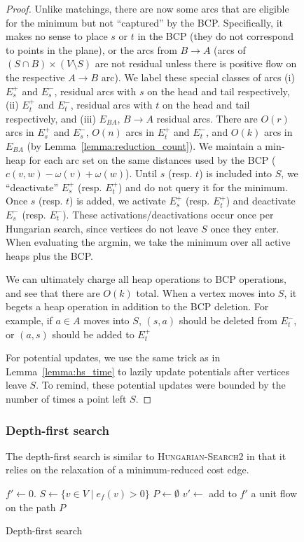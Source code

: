 \documentclass[11pt]{article}
\theoremstyle{plain}
\begin{document}
\begin{figure*}
\begin{proof}
Unlike matchings, there are now some arcs that are eligible for the
minimum but not ``captured'' by the BCP.
Specifically, it makes no sense to place $s$ or $t$ in the BCP
(they do not correspond to points in the plane), or the arcs from
$B \to A$ (arcs of $(S \cap B) \times (V \setminus S)$ are not residual
unless there is positive flow on the respective $A \to B$ arc).
We label these special classes of arcs (i) $E_s^+$ and $E_s^-$,
residual arcs with $s$ on the head and tail respectively, (ii)
$E_t^+$ and $E_t^-$, residual arcs with $t$ on the head and tail
respectively, and (iii) $E_{BA}$, $B \to A$ residual arcs.
There are $O(r)$ arcs in $E_s^+$ and $E_s^-$, $O(n)$ arcs in $E_t^+$
and $E_t^-$, and $O(k)$ arcs in $E_{BA}$
(by Lemma~\ref{lemma:reduction_count}).
We maintain a min-heap for each arc set on the same distances used
by the BCP ($c(v, w) - \omega(v) + \omega(w)$).
Until $s$ (resp. $t$) is included into $S$, we ``deactivate'' $E_s^+$
(resp. $E_t^+$) and do not query it for the minimum.
Once $s$ (resp. $t$) is added, we activate $E_s^+$ (resp. $E_t^+$) and
deactivate $E_s^-$ (resp. $E_t^-$).
These activations/deactivations occur once per Hungarian search, since
vertices do not leave $S$ once they enter.
When evaluating the argmin, we take the minimum over all active heaps
plus the BCP.

We can ultimately charge all heap operations to BCP operations, and
see that there are $O(k)$ total.
When a vertex moves into $S$, it begets a heap operation in addition
to the BCP deletion.
For example, if $a \in A$ moves into $S$, $(s, a)$ should be deleted
from $E_t^-$, or $(a, s)$ should be added to $E_t^+$


For potential updates, we use the same trick as in
Lemma~\ref{lemma:hs_time} to lazily update potentials after vertices
leave $S$.
To remind, these potential updates were bounded by the number of times
a point left $S$.

\end{proof}


\subsubsection{Depth-first search}

The depth-first search is similar to \textsc{Hungarian-Search2} in that it
relies on the relaxation of a minimum-reduced cost edge.
\begin{algorithm}
\caption{Depth-first search}
\begin{algorithmic}[1]
	\State $f' \gets 0$.
	\State $S \gets \{v \in V \mid e_f(v) > 0\}$
	\State $P \gets \emptyset$
	\Repeat
		\State $v' \gets$ 
			\State add to $f'$ a unit flow on the path $P$


\end{algorithmic}
\end{algorithm}
\end{figure*}
\end{document}
